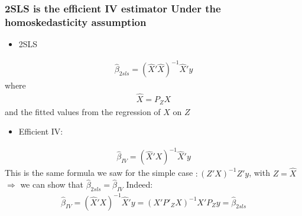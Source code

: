 \documentclass[a4paper,twoside,11pt]{article}
\begin{document}
\subsubsection{2SLS is the efficient IV estimator Under the homoskedasticity assumption}
\begin{itemize}
    \item 2SLS
\end{itemize}
\begin{equation*}
\begin{aligned}
\hat{\beta}_{2sls} = (\hat{X}'\hat{X})^{-1} \hat{X}' y
\end{aligned} 
\end{equation*}
where 
\begin{equation*}
\begin{aligned}
\hat{X} = P_Z X
\end{aligned} 
\end{equation*}
and the fitted values from the regression of $X$ on $Z$
\begin{itemize}
    \item Efficient IV:
\end{itemize}
\begin{equation*}
\begin{aligned}
\hat{\beta}_{IV} = (\hat{X}'X)^{-1} \hat{X}' y
\end{aligned} 
\end{equation*}
This is the same formula we saw for the simple case $:(Z'X)^{-1}Z'y$, with $Z= \hat{X}$
\newline
\newline
$\Rightarrow$ we can show that $\hat{\beta}_{2sls} = \hat{\beta}_{IV}$
\newline
Indeed:
\begin{equation*}
\begin{aligned}
\hat{\beta}_{IV} = (\hat{X}' X)^{-1} \hat{X}' y = (X' P'_Z X)^{-1} X'P_Z y =\hat{\beta}_{2sls}
\end{aligned} 
\end{equation*}
\end{document}
